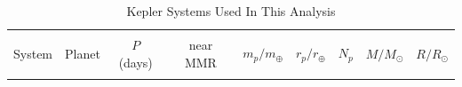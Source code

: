 \begin{center}
\begin{longtable}{rcrrrrrrr}
\caption[Portrait, single page table]{Kepler Systems Used In This Analysis} \\
 
\hline \hline \\[-0.1ex]
   \multicolumn{1}{c}{ {System}} &
   \multicolumn{1}{c}{ {Planet}} &
   \multicolumn{1}{c}{ {$P$ (days)}} &
   \multicolumn{1}{c}{ {near MMR}} &
   \multicolumn{1}{c}{ {$m_p/m_{\oplus}$}} &
   \multicolumn{1}{c}{ {$r_p/r_{\oplus}$}} &
   \multicolumn{1}{c}{ {$N_p$}}  &
   \multicolumn{1}{c}{ {$M/M_{\odot}$}} &
   \multicolumn{1}{c}{ {$R/R_{\odot}$}}  \\[0.5ex]\hline \hline \\[-2ex]
\endfirsthead


\end{longtable}
\end{center}
